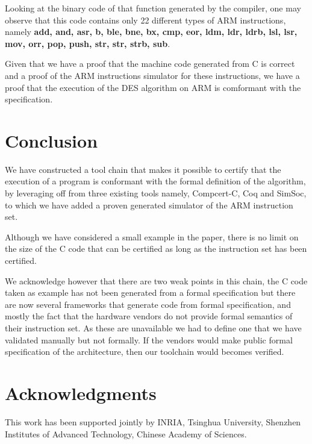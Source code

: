 \documentclass[a4paper, conference]{IEEEtran}
\begin{document}
Looking at the binary code of that function generated by the compiler,
one may observe that this code contains only 22 different types of ARM
instructions, namely \textbf{ add, and, asr, b, ble, bne, bx, cmp,
  eor, ldm, ldr, ldrb, lsl, lsr, mov, orr, pop, push, str, str, strb,
  sub}.

Given that we have a proof that the machine code generated from C is
correct and a proof of the ARM instructions simulator for these
instructions, we have a proof that the execution of the DES algorithm
on ARM is comformant with the specification.



\section{Conclusion}
\label{conclusion}
We have constructed a tool chain that makes it possible to certify
that the execution of a program is conformant with the formal
definition of the algorithm, by leveraging off from three existing tools
namely, Compcert-C, Coq and SimSoc, to which we have added a proven
generated simulator of the ARM instruction set.

Although we have considered a small example in the paper, there is no
limit on the size of the C code that can be certified as long as
the instruction set has been certified.

We acknowledge however that there are two weak points in this chain,
the C code taken as example has not been generated from a formal specification
but there are now several frameworks that generate code from formal
specification, and mostly the fact that the hardware vendors do not
provide formal semantics of their instruction set. As these are
unavailable we had to define one that we have validated manually
but not formally. If the vendors would make public formal specification
of the architecture, then our toolchain would becomes verified.



\section*{Acknowledgments}

This work has been supported jointly by INRIA, Tsinghua University,
Shenzhen Institutes of Advanced Technology, Chinese Academy of
Sciences.




%
%

\end{document}
